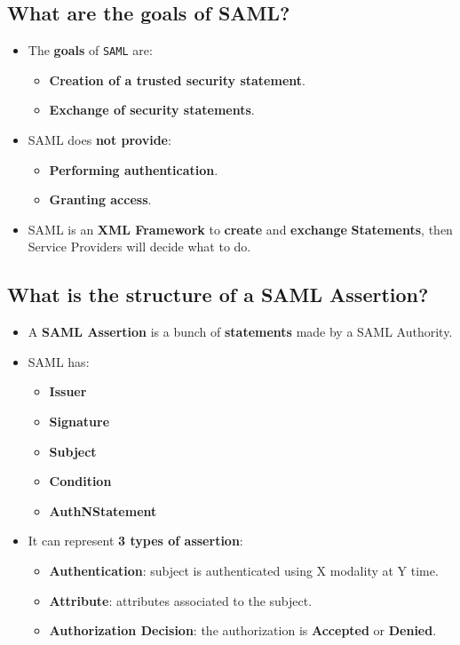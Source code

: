 \documentclass[9pt, letterpaper]{article}
\begin{document}
\subsection{What are the goals of SAML?}
\begin{itemize}
	\item The \textbf{goals} of {\tt SAML} are:
	\begin{itemize}
		\item \textbf{Creation of a trusted security statement}.
		\item \textbf{Exchange of security statements}.
	\end{itemize}
	\item SAML does \textbf{not provide}:
	\begin{itemize}
		\item \textbf{Performing authentication}.
		\item \textbf{Granting access}.
	\end{itemize}
	\item SAML is an \textbf{XML Framework} to \textbf{create} and \textbf{exchange} \textbf{Statements}, then Service Providers will decide what to do.
\end{itemize}

\subsection{What is the structure of a SAML Assertion?}
\begin{itemize}
	\item A \textbf{SAML Assertion} is a bunch of \textbf{statements} made by a SAML Authority.
	\item SAML has:
	\begin{itemize}
		\item \textbf{Issuer}
		\item \textbf{Signature}
		\item \textbf{Subject}
		\item \textbf{Condition}
		\item \textbf{AuthNStatement}
	\end{itemize}
	\item It can represent \textbf{3 types of assertion}:
	\begin{itemize}
		\item \textbf{Authentication}: subject is authenticated using X modality at Y time.
		\item \textbf{Attribute}: attributes associated to the subject.
		\item \textbf{Authorization Decision}: the authorization is \textbf{Accepted} or \textbf{Denied}.
	\end{itemize}
\end{itemize}
\end{document}
